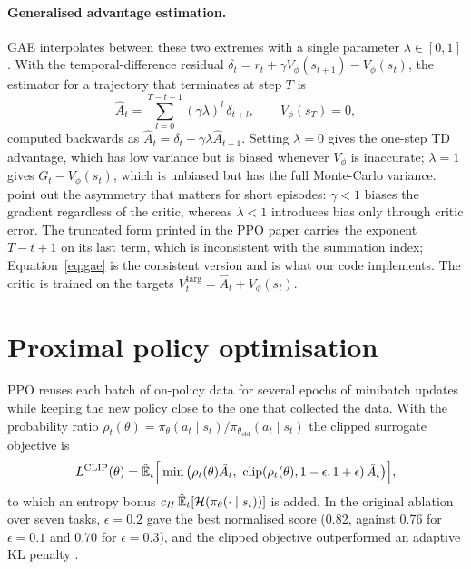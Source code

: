 \paragraph{Generalised advantage estimation.} GAE \citep{schulman2016gae} interpolates between these two extremes with a single parameter $\lambda\in[0,1]$. With the temporal-difference residual $\delta_t=r_t+\gamma V_\phi(s_{t+1})-V_\phi(s_t)$, the estimator for a trajectory that terminates at step $T$ is
\begin{equation}
  \hat A_t=\sum_{l=0}^{T-t-1}(\gamma\lambda)^l\,\delta_{t+l},
  \qquad V_\phi(s_T)=0 ,
  \label{eq:gae}
\end{equation}
computed backwards as $\hat A_t=\delta_t+\gamma\lambda\hat A_{t+1}$. Setting $\lambda=0$ gives the one-step TD advantage, which has low variance but is biased whenever $V_\phi$ is inaccurate; $\lambda=1$ gives $G_t-V_\phi(s_t)$, which is unbiased but has the full Monte-Carlo variance. \citet{schulman2016gae} point out the asymmetry that matters for short episodes: $\gamma<1$ biases the gradient regardless of the critic, whereas $\lambda<1$ introduces bias only through critic error. The truncated form printed in the PPO paper carries the exponent $T-t+1$ on its last term, which is inconsistent with the summation index; Equation~\eqref{eq:gae} is the consistent version and is what our code implements. The critic is trained on the targets $V^{\mathrm{targ}}_t=\hat A_t+V_\phi(s_t)$.

\section{Proximal policy optimisation}

PPO \citep{schulman2017ppo} reuses each batch of on-policy data for several epochs of minibatch updates while keeping the new policy close to the one that collected the data. With the probability ratio $\rho_t(\theta)=\pi_\theta(a_t\mid s_t)/\pi_{\theta_{\mathrm{old}}}(a_t\mid s_t)$ the clipped surrogate objective is
\begin{equation}
  L^{\mathrm{CLIP}}(\theta)=\hat{\mathbb{E}}_t\Big[\min\big(\rho_t(\theta)\hat A_t,\ \operatorname{clip}(\rho_t(\theta),1-\epsilon,1+\epsilon)\,\hat A_t\big)\Big],
  \label{eq:ppo}
\end{equation}
to which an entropy bonus $c_H\,\hat{\mathbb{E}}_t[\mathcal{H}(\pi_\theta(\cdot\mid s_t))]$ is added. In the original ablation over seven tasks, $\epsilon=0.2$ gave the best normalised score (0.82, against 0.76 for $\epsilon=0.1$ and 0.70 for $\epsilon=0.3$), and the clipped objective outperformed an adaptive KL penalty \citep{schulman2017ppo}.

